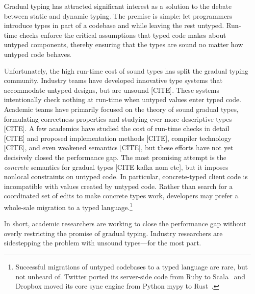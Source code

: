 \documentclass[english,cleveref,submission]{programming}
\begin{document}
Gradual typing has attracted significant interest as a solution to
the debate between static and dynamic typing.
The premise is simple: let programmers introduce types in part of a
codebase and while leaving the rest untyped.
Run-time checks enforce the critical assumptions that typed code makes about
untyped components, thereby ensuring that the types are sound no matter how
untyped code behaves.

Unfortunately, the high run-time cost of sound types has split
the gradual typing community.
Industry teams have developed innovative type systems that accommodate
untyped designs, but are unsound [CITE].
These systems intentionally check nothing at run-time when untyped values enter
typed code.
Academic teams have primarily focused on the theory of sound
gradual types, formulating correctness properties and studying ever-more-descriptive types [CITE].
A few academics have studied the cost of run-time checks
in detail [CITE] and proposed implementation methods [CITE],
compiler technology [CITE],
and even weakened semantics [CITE], but these efforts have not yet
decisively closed the performance gap.
The most promising attempt is the \emph{concrete} semantics
for gradual types [CITE kafka nom etc], but it imposes nonlocal
constraints on untyped code.
In particular, concrete-typed client code is incompatible with
values created by untyped code.
Rather than search for a coordinated set of edits to make concrete
types work, developers may prefer a whole-sale migration to
a typed language.\footnote{Successful migrations of untyped codebases
to a typed language are rare, but not unheard of.
Twitter ported its server-side code from Ruby to Scala~\cite{twitter-scala}
and Dropbox moved its core sync engine from Python mypy to Rust~\cite{dropbox-rust}.}

In short, academic researchers are working to close the performance gap
without overly restricting the promise of gradual typing.
Industry researchers are sidestepping the problem with unsound types---for the most part.
\end{document}
